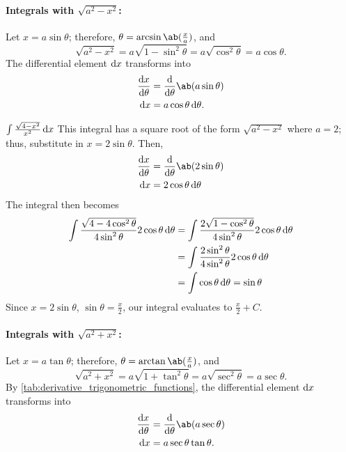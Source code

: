 \paragraph{Integrals with $\sqrt{a^2 - x^2}$:} Let $x = a\sin\theta$; therefore, $\theta = \arcsin\ab(\frac{x}{a})$, and
\begin{equation}
  \sqrt{a^2 - x^2} = a\sqrt{1 - \sin^2\theta} = a\sqrt{\cos^2\theta} = a\cos\theta.
\end{equation}
The differential element $\odif{x}$ transforms into
\begin{align}
  \odv{x}{\theta} & = \odv*{\ab(a\sin\theta)}{\theta} \\
  \odif{x}        & = a\cos\theta\odif{\theta}.
\end{align}
\begin{exmp}{$\int\frac{\sqrt{4 - x^2}}{x^2}\odif{x}$}{}
  This integral has a square root of the form $\sqrt{a^2 - x^2}$ where $a = 2$; thus, substitute in $x = 2\sin\theta$. Then,
  \begin{align}
    \odv{x}{\theta} & = \odv*{\ab(2\sin\theta)}{\theta} \\
    \odif{x}        & = 2\cos\theta\odif{\theta}
  \end{align}
  The integral then becomes
  \begin{align}
    \int\frac{\sqrt{4 - 4\cos^2\theta}}{4\sin^2\theta}2\cos\theta\odif{\theta} & = \int \frac{2\sqrt{1 - \cos^2\theta}}{4\sin^2\theta}2\cos\theta\odif{\theta} \\
                                                                               & = \int\frac{2\sin^2\theta}{4\sin^2\theta}{2\cos\theta}\odif{\theta}           \\
                                                                               & = \int\cos\theta\odif{\theta} = \sin\theta
  \end{align}
  Since $x = 2\sin\theta$, $\sin\theta = \frac{x}{2}$, our integral evaluates to $\frac{x}{2} + C$.
\end{exmp}

\paragraph{Integrals with $\sqrt{a^2 + x^2}$:} Let $x = a\tan\theta$; therefore, $\theta = \arctan\ab(\frac{x}{a})$, and
\begin{equation}
  \sqrt{a^2 + x^2} = a\sqrt{1 + \tan^2\theta} = a\sqrt{\sec^2\theta} = a\sec\theta.
\end{equation}
By \cref{tab:derivative_trigonometric_functions}, the differential element $\odif{x}$ transforms into
\begin{align}
  \odv{x}{\theta} & = \odv*{\ab(a\sec\theta)}{\theta} \\
  \odif{x}        & = a\sec\theta\tan\theta.
\end{align}

